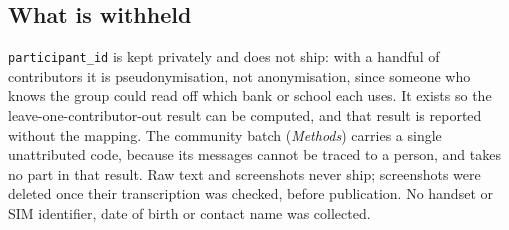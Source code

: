 \subsection*{What is withheld}
\texttt{participant\_id} is kept privately and does not ship: with a handful of contributors it
is pseudonymisation, not anonymisation, since someone who knows the group could read off which
bank or school each uses. It exists so the leave-one-contributor-out result can be computed,
and that result is reported without the mapping. The community batch (\emph{Methods}) carries a
single unattributed code, because its messages cannot be traced to a person, and takes no part
in that result. Raw text and screenshots never ship;
screenshots were deleted once their transcription was checked, before publication. No handset
or SIM identifier, date of birth or contact name was collected.
